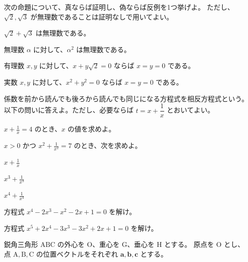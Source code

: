 \documentclass[paper=b5,fontsize=10pt]{jlreq}
\begin{document}
\ScratchPage

\newpage
{}
次の命題について、真ならば証明し、偽ならば反例を1つ挙げよ。
ただし、$\sqrt2,\sqrt3$ が無理数であることは証明なしで用いてよい。

\vspace{\baselineskip}
\begin{mondai}
  \item $\sqrt2+\sqrt3$ は無理数である。
  \vspace{1.2\baselineskip}
  \item 無理数 $\alpha$ に対して、$\alpha^2$ は無理数である。
  \vspace{1.2\baselineskip}
  \item 有理数 $x,y$ に対して、$x+y\sqrt2=0$ ならば $x=y=0$ である。
  \vspace{1.2\baselineskip}
  \item 実数 $x,y$ に対して、$x^2+y^2=0$ ならば $x=y=0$ である。
\end{mondai}

\ScratchPage

\newpage
{}
係数を前から読んでも後ろから読んでも同じになる方程式を相反方程式という。
以下の問いに答えよ。ただし、必要ならば $t=x+\dfrac1x$ とおいてよい。

\vspace{\baselineskip}
\begin{mondai}
  \item $\displaystyle x+\frac1x=4$ のとき、$x$ の値を求めよ。
  \item $x>0$ かつ $\displaystyle x^2+\frac1{x^2}=7$ のとき、次を求めよ。
  \begin{mondai}
    \item $\displaystyle x+\frac1x$
    \item $\displaystyle x^3+\frac1{x^3}$
    \item $\displaystyle x^4+\frac1{x^4}$
  \end{mondai}
  \item 方程式 $x^4-2x^3-x^2-2x+1=0$ を解け。
  \item 方程式 $x^5+2x^4-3x^3-3x^2+2x+1=0$ を解け。
\end{mondai}

\ScratchPage

\newpage
{}
鋭角三角形 $\mathrm{ABC}$ の外心を $\mathrm O$、重心を $\mathrm G$、垂心を $\mathrm H$ とする。
原点を $\mathrm O$ とし、点 $\mathrm A,\mathrm B,\mathrm C$ の位置ベクトルをそれぞれ
$\boldsymbol a,\boldsymbol b,\boldsymbol c$ とする。
\end{document}
